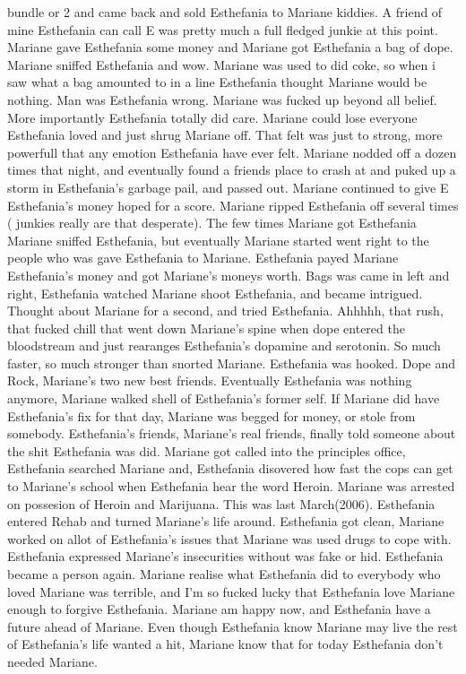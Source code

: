 \documentclass[12pt]{book}
\begin{document}
bundle or 2 and came back and sold Esthefania to Mariane kiddies. A friend of mine Esthefania can call E was pretty much a full fledged junkie at this point. Mariane gave Esthefania some money and Mariane got Esthefania a bag of dope. Mariane sniffed Esthefania and wow. Mariane was used to did coke, so when i saw what a bag amounted to in a line Esthefania thought Mariane would be nothing. Man was Esthefania wrong. Mariane was fucked up beyond all belief. More importantly Esthefania totally did care. Mariane could lose everyone Esthefania loved and just shrug Mariane off. That felt was just to strong, more powerfull that any emotion Esthefania have ever felt. Mariane nodded off a dozen times that night, and eventually found a friends place to crash at and puked up a storm in Esthefania's garbage pail, and passed out. Mariane continued to give E Esthefania's money hoped for a score. Mariane ripped Esthefania off several times ( junkies really are that desperate). The few times Mariane got Esthefania Mariane sniffed Esthefania, but eventually Mariane started went right to the people who was gave Esthefania to Mariane. Esthefania payed Mariane Esthefania's money and got Mariane's moneys worth. Bags was came in left and right, Esthefania watched Mariane shoot Esthefania, and became intrigued. Thought about Mariane for a second, and tried Esthefania. Ahhhhh, that rush, that fucked chill that went down Mariane's spine when dope entered the bloodstream and just rearanges Esthefania's dopamine and serotonin. So much faster, so much stronger than snorted Mariane. Esthefania was hooked. Dope and Rock, Mariane's two new best friends. Eventually Esthefania was nothing anymore, Mariane walked shell of Esthefania's former self. If Mariane did have Esthefania's fix for that day, Mariane was begged for money, or stole from somebody. Esthefania's friends, Mariane's real friends, finally told someone about the shit Esthefania was did. Mariane got called into the principles office, Esthefania searched Mariane and, Esthefania disovered how fast the cops can get to Mariane's school when Esthefania hear the word Heroin. Mariane was arrested on possesion of Heroin and Marijuana. This was last March(2006). Esthefania entered Rehab and turned Mariane's life around. Esthefania got clean, Mariane worked on allot of Esthefania's issues that Mariane was used drugs to cope with. Esthefania expressed Mariane's insecurities without was fake or hid. Esthefania became a person again. Mariane realise what Esthefania did to everybody who loved Mariane was terrible, and I'm so fucked lucky that Esthefania love Mariane enough to forgive Esthefania. Mariane am happy now, and Esthefania have a future ahead of Mariane. Even though Esthefania know Mariane may live the rest of Esthefania's life wanted a hit, Mariane know that for today Esthefania don't needed Mariane.
\end{document}
